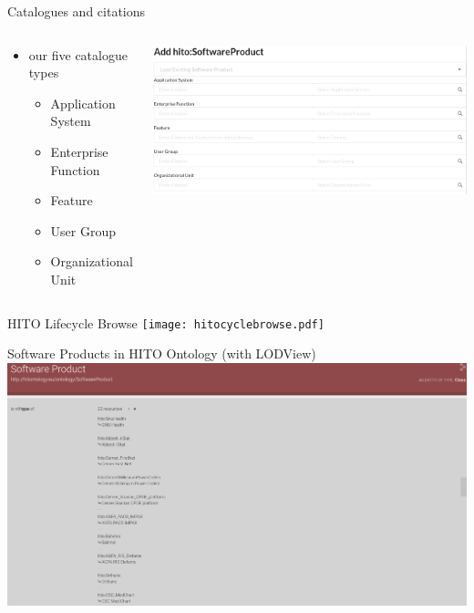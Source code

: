 \documentclass[aspectratio=1610,12pt]{beamer}
\begin{document}
\begin{frame}{Catalogues and citations}
\begin{columns}
  \vspace{-1cm}
  \begin{spacing}{1.25}
    \begin{itemize}
      \item our five catalogue types
      \begin{itemize}
        \item Application System
        \item Enterprise Function
        \item Feature
        \item User Group
        \item Organizational Unit
      \end{itemize}
    \end{itemize}
  \end{spacing}
  \centering
  \includegraphics[width=\textwidth]{img/iglook.png}
\end{columns}
\end{frame}

\begin{frame}{HITO Lifecycle Browse}
  \centering
  \vspace{-0.5cm}
  \texttt{[image: hitocyclebrowse.pdf]}
\end{frame}

\begin{frame}{Software Products in HITO Ontology (with LODView)}
\centering
\includegraphics[width=\textwidth]{img/softwareproduct.png}
\end{frame}
\end{document}
